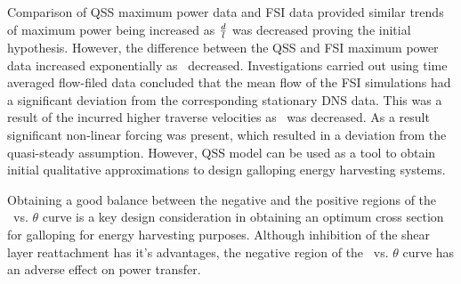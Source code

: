 Comparison of QSS maximum power data and FSI data provided similar trends of maximum power being increased as $\frac{d}{l}$ was decreased proving the initial hypothesis. However, the difference between the QSS and FSI maximum power data increased exponentially as \ratio\ decreased. Investigations carried out using time averaged flow-filed data concluded that the mean flow of the FSI simulations had a significant deviation from the corresponding stationary DNS data. This was a result of the incurred higher  traverse velocities as \ratio\ was decreased. As a result significant non-linear forcing was present, which resulted in a deviation from the quasi-steady assumption. However, QSS model can be used as a tool to obtain initial qualitative approximations to design galloping energy harvesting systems. 

Obtaining a good balance between the negative and the positive regions of the \cy\ vs. $\theta$ curve is a key design consideration in obtaining an optimum cross section for galloping for energy harvesting purposes. Although inhibition of the shear layer reattachment has it's advantages, the negative region of the \cy\ vs. $\theta$ curve has an adverse effect on power transfer. 








  

